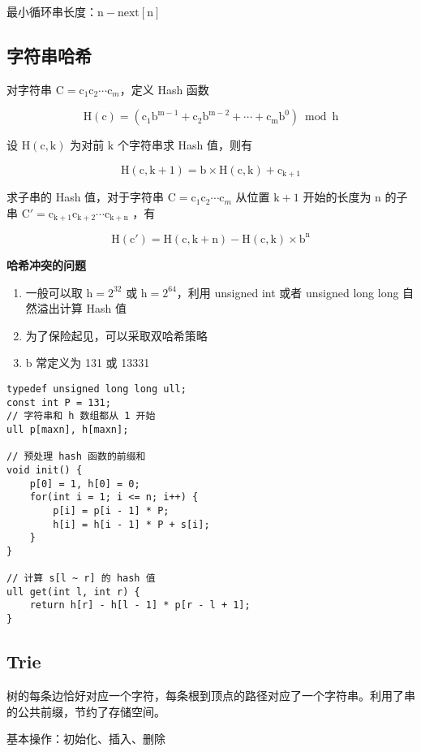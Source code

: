 \documentclass[UTF8]{article}
\begin{document}
最小循环串长度：$\mathrm{n-next[n]}$



\subsection{字符串哈希}
对字符串 $\text{C} = \text{c}_1\text{c} _2\cdots \text{c}_m$，定义 Hash 函数

$$
\mathrm{H(c) = (c_1b^{m-1}+c_2b^{m-2}+\cdots+c_mb^0) \bmod h} 
$$

设 $\mathrm{H(c, k)}$ 为对前 $\mathrm{k}$ 个字符串求 Hash 值，则有

$$
\mathrm{H(c, k+1) = b \times H(c, k) + c_{k + 1}}
$$

求子串的 Hash 值，对于字符串 $\text{C} = \text{c}_1\text{c} _2\cdots \text{c}_m$ 从位置 $\mathrm{k+1}$ 开始的长度为 $\mathrm{n}$ 的子串 $\mathrm{C' = c_{k+1}c_{k+2} \cdots c_{k+n} }$ ，有

$$
\mathrm{H(c') = H(c, k + n) - H(c, k) \times b^n}
$$

\noindent \textbf{哈希冲突的问题}

\begin{enumerate}
	\item 一般可以取 $\mathrm{h = 2 ^ {32}}$ 或 $\mathrm{h = 2^{64}}$，利用 unsigned int 或者 unsigned long long 自然溢出计算 Hash 值
	\item 为了保险起见，可以采取双哈希策略
	\item $\mathrm{b}$ 常定义为 131 或 13331
\end{enumerate}

\begin{lstlisting}[caption=字符串哈希]
typedef unsigned long long ull;
const int P = 131;
// 字符串和 h 数组都从 1 开始
ull p[maxn], h[maxn];

// 预处理 hash 函数的前缀和
void init() {
	p[0] = 1, h[0] = 0;
	for(int i = 1; i <= n; i++) {
		p[i] = p[i - 1] * P;
		h[i] = h[i - 1] * P + s[i]; 
	}
}

// 计算 s[l ~ r] 的 hash 值
ull get(int l, int r) {
	return h[r] - h[l - 1] * p[r - l + 1];
}
\end{lstlisting}



\subsection{Trie}
树的每条边恰好对应一个字符，每条根到顶点的路径对应了一个字符串。利用了串的公共前缀，节约了存储空间。

基本操作：初始化、插入、删除
\end{document}
